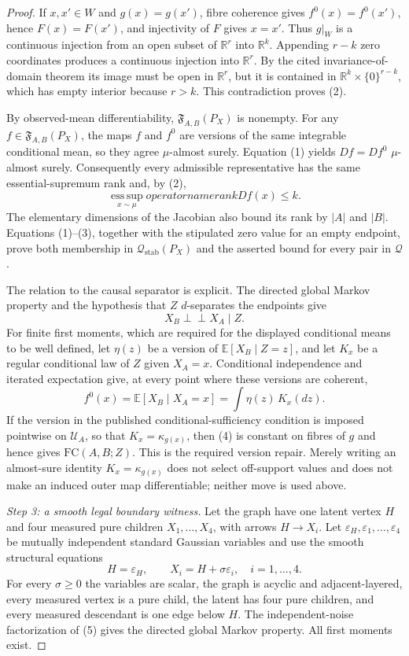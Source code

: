 \documentclass{article}
\begin{document}
\begin{proof}
If \(x,x'\in W\) and \(g(x)=g(x')\), fibre coherence gives \(f^0(x)=f^0(x')\), hence \(F(x)=F(x')\), and injectivity of \(F\) gives \(x=x'\).  Thus \(g|_W\) is a continuous injection from an open subset of \(\mathbb R^r\) into \(\mathbb R^k\).  Appending \(r-k\) zero coordinates produces a continuous injection into \(\mathbb R^r\).  By the cited invariance-of-domain theorem its image must be open in \(\mathbb R^r\), but it is contained in \(\mathbb R^k\times\{0\}^{r-k}\), which has empty interior because \(r>k\).  This contradiction proves (2).

By observed-mean differentiability, \(\mathfrak F_{A,B}(P_X)\) is nonempty.  For any \(f\in\mathfrak F_{A,B}(P_X)\), the maps \(f\) and \(f^0\) are versions of the same integrable conditional mean, so they agree \(\mu\)-almost surely.  Equation (1) yields \(Df=Df^0\) \(\mu\)-almost surely.  Consequently every admissible representative has the same essential-supremum rank and, by (2),
\[
 \operatorname*{ess\,sup}_{x\sim\mu}operatorname{rank}Df(x)
 \leq k. \tag{3}
\]
The elementary dimensions of the Jacobian also bound its rank by \(|A|\) and \(|B|\).  Equations (1)--(3), together with the stipulated zero value for an empty endpoint, prove both membership in \(\mathcal Q_{\mathrm{stab}}(P_X)\) and the asserted bound for every pair in \(\mathscr Q\).

The relation to the causal separator is explicit.  The directed global Markov property and the hypothesis that \(Z\) \(d\)-separates the endpoints give
\[
 X_B\mathbin{\perp\!\!\!\perp}X_A\mid Z.
\]
For finite first moments, which are required for the displayed conditional means to be well defined, let \(\eta(z)\) be a version of \(\mathbb E[X_B\mid Z=z]\), and let \(K_x\) be a regular conditional law of \(Z\) given \(X_A=x\).  Conditional independence and iterated expectation give, at every point where these versions are coherent,
\[
 f^0(x)=\mathbb E[X_B\mid X_A=x]
       =\int \eta(z)\,K_x(dz). \tag{4}
\]
If the version in the published conditional-sufficiency condition is imposed pointwise on \(\mathcal U_A\), so that \(K_x=\kappa_{g(x)}\), then (4) is constant on fibres of \(g\) and hence gives \(\mathrm{FC}(A,B;Z)\).  This is the required version repair.  Merely writing an almost-sure identity \(K_x=\kappa_{g(x)}\) does not select off-support values and does not make an induced outer map differentiable; neither move is used above.

\emph{Step 3: a smooth legal boundary witness.}
Let the graph have one latent vertex \(H\) and four measured pure children \(X_1,\ldots,X_4\), with arrows \(H\to X_i\).  Let \(\varepsilon_H,\varepsilon_1,\ldots,\varepsilon_4\) be mutually independent standard Gaussian variables and use the smooth structural equations
\[
 H=\varepsilon_H,
 \qquad
 X_i=H+\sigma\varepsilon_i,\quad i=1,\ldots,4. \tag{5}
\]
For every \(\sigma\geq0\) the variables are scalar, the graph is acyclic and adjacent-layered, every measured vertex is a pure child, the latent has four pure children, and every measured descendant is one edge below \(H\).  The independent-noise factorization of (5) gives the directed global Markov property.  All first moments exist.


\end{proof}
\end{document}
